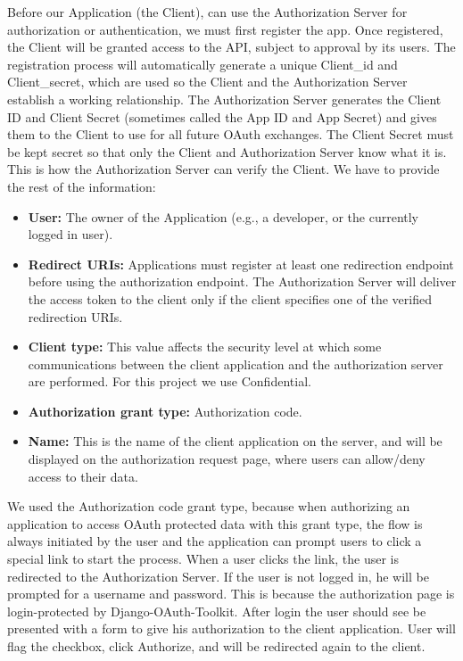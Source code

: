Before our Application (the Client), can use the Authorization Server for authorization or authentication, we must first register the app. Once registered, the Client will be granted access to the API, subject to approval by its users. The registration process will automatically generate a unique Client\_id and Client\_secret, which are used so the Client and the Authorization Server establish a working relationship. The Authorization Server generates the Client ID and Client Secret (sometimes called the App ID and App Secret) and gives them to the Client to use for all future OAuth exchanges. The Client Secret must be kept secret so that only the Client and Authorization Server know what it is. This is how the Authorization Server can verify the Client. We have to provide the rest of the information:

\begin{itemize}

	\item \textbf{User:} The owner of the Application (e.g., a developer, or the currently logged in user).

	\item \textbf{Redirect URIs:} Applications must register at least one redirection endpoint before using the authorization endpoint. The Authorization Server will deliver the access token to the client only if the client specifies one of the verified redirection URIs.

	\item \textbf{Client type:} This value affects the security level at which some communications between the client application and the authorization server are performed. For this project we use Confidential.

	\item \textbf{Authorization grant type:} Authorization code.

	\item \textbf{Name:} This is the name of the client application on the server, and will be displayed on the authorization request page, where users can allow/deny access to their data.

\end{itemize}

We used the Authorization code grant type, because when authorizing an application to access OAuth protected data with this grant type, the flow is always initiated by the user and the application can prompt users to click a special link to start the process. When a user clicks the link, the user is redirected to the Authorization Server. If the user is not logged in, he will be prompted for a username and password. This is because the authorization page is login-protected by Django-OAuth-Toolkit. After login the user should see be presented with a form to give his authorization to the client application. User will flag the checkbox, click Authorize, and will be redirected again to the client.

